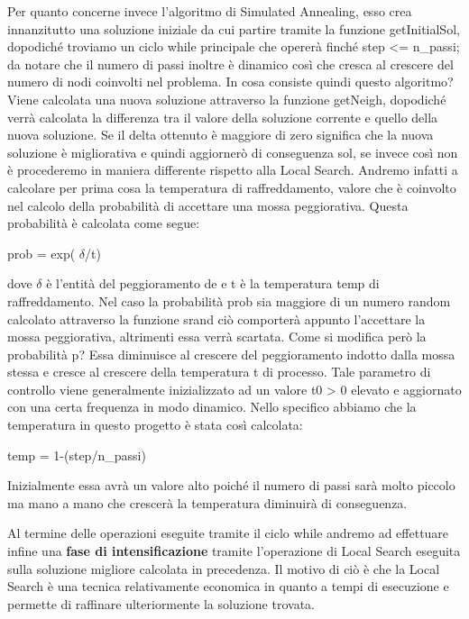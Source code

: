 \documentclass[preprint,12pt]{elsarticle}
\begin{document}
Per quanto concerne invece l'algoritmo di Simulated Annealing, esso crea innanzitutto una soluzione iniziale da cui partire tramite la funzione getInitialSol, dopodiché troviamo un ciclo while principale che opererà finché step <= n\_passi; da notare che il numero di passi inoltre è dinamico così che cresca al crescere del numero di nodi coinvolti nel problema. In cosa consiste quindi questo algoritmo? Viene calcolata una nuova soluzione attraverso la funzione getNeigh, dopodiché verrà calcolata la differenza tra il valore della soluzione corrente e quello della nuova soluzione. Se il delta ottenuto è maggiore di zero significa che la nuova soluzione è migliorativa e quindi aggiornerò di conseguenza sol, se invece così non è procederemo in maniera differente rispetto alla Local Search. Andremo infatti a calcolare per prima cosa la temperatura di raffreddamento, valore che è coinvolto nel calcolo della probabilità di accettare una mossa peggiorativa. Questa probabilità è calcolata come segue:

\begin{center}
prob = exp( $\delta$/t)
\end{center}

dove $\delta$ è l'entità del peggioramento de e t è la temperatura temp di raffreddamento. Nel caso la probabilità prob sia maggiore di un numero random calcolato attraverso la funzione srand ciò comporterà appunto l'accettare la mossa peggiorativa, altrimenti essa verrà scartata. Come si modifica però la probabilità p? Essa diminuisce al crescere del peggioramento indotto dalla mossa stessa e cresce al crescere della temperatura t di processo. Tale parametro di controllo viene generalmente inizializzato ad un valore t{\tiny 0} > 0 elevato e aggiornato con una certa frequenza in modo dinamico. Nello specifico abbiamo che la temperatura in questo progetto è stata così calcolata: 

\begin{center}
temp = 1-(step/n\_passi)
\end{center}
Inizialmente essa avrà un valore alto poiché il numero di passi sarà molto piccolo ma mano a mano che crescerà la temperatura diminuirà di conseguenza.

Al termine delle operazioni eseguite tramite il ciclo while andremo ad effettuare infine una \textbf{fase di intensificazione} tramite l'operazione di Local Search eseguita sulla soluzione migliore calcolata in precedenza. Il motivo di ciò è che la Local Search è una tecnica relativamente economica in quanto a tempi di esecuzione e permette di raffinare ulteriormente la soluzione trovata.
\end{document}
